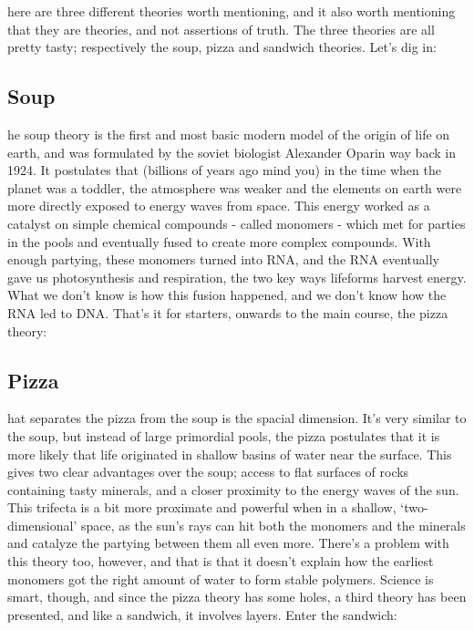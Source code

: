 here are three different theories worth mentioning, and it also worth mentioning that they are theories, and not assertions of truth. The three theories are all pretty tasty; respectively the soup, pizza and sandwich theories. Let’s dig in:

\subsection{Soup}
he soup theory is the first and most basic modern model of the origin of life on earth, and was formulated by the soviet biologist Alexander Oparin way back in 1924. It postulates\cite{shapiro} that (billions of years ago mind you) in the time when the planet was a toddler, the atmosphere was weaker and the elements on earth were more directly exposed to energy waves from space. This energy worked as a catalyst on simple chemical compounds - called monomers - which met for parties in the pools and eventually fused to create more complex compounds. With enough partying, these monomers turned into RNA, and the RNA eventually gave us photosynthesis and respiration, the two key ways lifeforms harvest energy. What we don’t know is how this fusion happened, and we don’t know how the RNA led to DNA. That’s it for starters, onwards to the main course, the pizza theory: 

\subsection{Pizza}
hat separates the pizza from the soup is the spacial dimension. It’s very similar to the soup, but instead of large primordial pools, the pizza postulates that it is more likely that life originated in shallow basins of water near the surface.\cite{oestgaard} This gives two clear advantages over the soup; access to flat surfaces of rocks containing tasty minerals, and a closer proximity to the energy waves of the sun. This trifecta is a bit more proximate and powerful when in a shallow, ‘two-dimensional’ space, as the sun’s rays can hit both the monomers and the minerals and catalyze the partying between them all even more. There’s a problem with this theory too, however, and that is that it doesn’t explain how the earliest monomers got the right amount of water to form stable polymers. Science is smart, though, and since the pizza theory has some holes, a third theory has been presented, and like a sandwich, it involves layers. Enter the sandwich:

